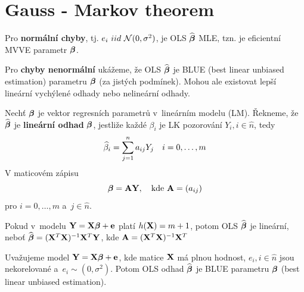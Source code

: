 \section{Gauss - Markov theorem}
Pro \textbf{normální chyby}, tj. $e_i~iid~\mathcal{N}(0,\sigma^2)$, je OLS $\widehat{\boldsymbol{\beta}}$ MLE, tzn. je eficientní MVVE parametr $\boldsymbol{\beta}$.

Pro \textbf{chyby nenormální} ukážeme, že OLS $\widehat{\boldsymbol{\beta}}$ je BLUE (best linear unbiased estimation) parametru $\boldsymbol{\beta}$ (za jistých podmínek). Mohou ale existovat lepší lineární vychýlené odhady nebo nelineární odhady.

\begin{define}
	Nechť $\boldsymbol{\beta}$ je vektor regresních parametrů v~lineárním modelu (LM). Řekneme, že $\widehat{\boldsymbol{\beta}}$ je \textbf{lineární odhad} $\boldsymbol{\beta}$, jestliže každé $\beta_i$ je LK pozorování $Y_i, i\in\widehat{n} $, tedy
	 $$
		\widehat{\beta}_i = \sum\limits_{j=1}^{n} a_{ij} Y_j \quad i = 0,\dots,m
	 $$
V maticovém zápisu
	 $$
		\boldsymbol{\beta} = \textbf{A} \mathbf{Y}, \quad \text{kde } \textbf{A} = (a_{ij})
	 $$
pro $i = 0,\dots, m$ a~$j  \in\widehat{n} $.
\end{define}
\begin{remark}
 Pokud v~modelu $\mathbf{Y} = \mathbf{X} \boldsymbol{\beta} + \mathbf{e}$ platí $h(\mathbf{X}) = m+1$, potom OLS $\widehat{\boldsymbol{\beta}}$ je lineární, neboť $\widehat{\boldsymbol{\beta}} = (\mathbf{X}^T \mathbf{X})^{-1} \mathbf{X}^T \mathbf{Y}$, kde $\textbf{A} = (\mathbf{X}^T \mathbf{X})^{-1} \mathbf{X}^T$
\end{remark}
\begin{theorem}
	Uvažujeme model $\mathbf{Y} = \mathbf{X} \boldsymbol{\beta} + \mathbf{e}$, kde matice $\mathbf{X}$ má plnou hodnost, $e_i, i\in\widehat{n} $ jsou nekorelované a~$e_i \sim (0, \sigma^2)$. Potom OLS odhad $\widehat{\boldsymbol{\beta}}$ je BLUE parametru $\boldsymbol{\beta}$ (best linear unbiased estimation).
\end{theorem}
